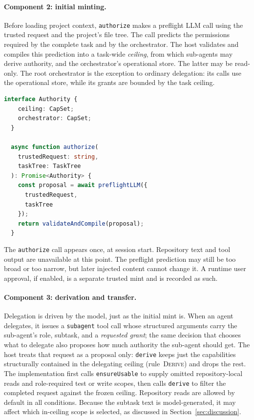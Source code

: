 \documentclass[sigplan,review,anonymous]{acmart}
\newcommand{\rulename}[1]{\textsc{#1}}
\begin{document}
  \paragraph{Component 2: initial minting.}
  Before loading project context, \texttt{authorize} makes a preflight LLM
  call using the trusted request and the project's file tree. The call predicts the
  permissions required by the complete task and by the orchestrator. The host
  validates and compiles this prediction into a task-wide \emph{ceiling}, from
  which sub-agents may derive authority, and the orchestrator's operational
  store. The latter may be read-only. The root orchestrator is the exception to
  ordinary delegation: its calls use the operational store, while its grants
  are bounded by the task ceiling.

  \begin{lstlisting}[language=TypeScript,style=tsstyle,caption={Schematic
    pseudocode for initial authorization.}]
  interface Authority {
    ceiling: CapSet;
    orchestrator: CapSet;
  }

  async function authorize(
    trustedRequest: string,
    taskTree: TaskTree
  ): Promise<Authority> {
    const proposal = await preflightLLM({
      trustedRequest,
      taskTree
    });
    return validateAndCompile(proposal);
  }
  \end{lstlisting}

  \noindent The \texttt{authorize} call appears once, at session start.
  Repository text and tool output are unavailable at this point. The
  preflight prediction may still be too broad or too narrow, but later
  injected content cannot change it. A runtime user approval, if enabled, is a
  separate trusted mint and is recorded as such.

  \paragraph{Component 3: derivation and transfer.}
  Delegation is driven by the model, just as the initial mint is. When an agent
  delegates, it issues a \texttt{subagent} tool call whose structured arguments
  carry the sub-agent's role, subtask, and a \emph{requested grant}; the same
  decision that chooses what to delegate also proposes how much authority the
  sub-agent should get. The host treats that request as a proposal only:
  \texttt{derive} keeps just the capabilities structurally contained in the
  delegating ceiling (rule~\rulename{Derive}) and drops the rest. The
  implementation first calls \texttt{ensureUsable} to supply omitted
  repository-local reads and role-required test or write scopes, then calls
  \texttt{derive} to filter the completed request against the frozen ceiling.
  Repository reads are allowed by default in all conditions. Because the
  subtask text is model-generated, it may affect which in-ceiling scope is
  selected, as discussed in Section~\ref{sec:discussion}.
\end{document}
